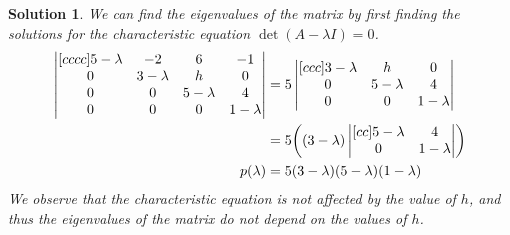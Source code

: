 \documentclass[11pt]{scrartcl}
\theoremstyle{dotlessP}
\newtheorem{sol}{Solution}[section]
\theoremstyle{dotlessN}
\DeclarePairedDelimiter\paren{(}{)} %
\begin{document}
\begin{sol}
	We can find the eigenvalues of the matrix by first finding the solutions for the characteristic equation $\det(A-\lambda I) = 0$.
	\begin{align*}
		\begin{vmatrix}[cccc]
			5- \lambda & -2 & 6 & -1 \\
			0 & 3 - \lambda & h & 0 \\
			0 & 0 & 5 -\lambda & 4 \\
			0 & 0 & 0 & 1 - \lambda
		\end{vmatrix} &= 5
		\begin{vmatrix}[ccc]
			3-\lambda & h & 0 \\
			0 & 5-\lambda & 4 \\
			0 & 0 & 1-\lambda
		\end{vmatrix} \\
		&= 5\paren*{
		(3-\lambda)
		\begin{vmatrix}[cc]
			5-\lambda & 4 \\
			0 & 1-\lambda
		\end{vmatrix}
		} \\
	p(\lambda)	&= 5(3-\lambda)(5-\lambda)(1-\lambda) 
	\end{align*}
	We observe that the characteristic equation is not affected by the value of $h$, and thus the eigenvalues of the matrix do not depend on the values of $h$.
	\\


\end{sol}
\end{document}
